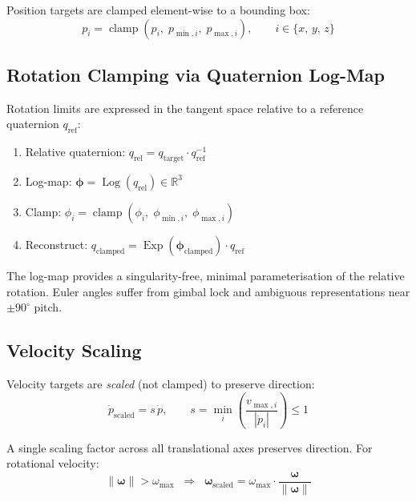 \documentclass[11pt,a4paper]{article}
\newcommand{\R}{\mathbb{R}}
\newcommand{\Exp}{\operatorname{Exp}}
\newcommand{\Log}{\operatorname{Log}}
\newcommand{\clamp}{\operatorname{clamp}}
\begin{document}
Position targets are clamped element-wise to a bounding box:
\[
  p_i = \clamp(p_i,\; p_{\min,i},\; p_{\max,i}),
  \qquad i \in \{x,\,y,\,z\}
\]

\subsection{Rotation Clamping via Quaternion Log-Map}
\label{sec:rot_clamp}

Rotation limits are expressed in the tangent space relative to a reference
quaternion $q_{\text{ref}}$:

\begin{enumerate}[nosep]
  \item Relative quaternion:
    $q_{\text{rel}} = q_{\text{target}} \cdot q_{\text{ref}}^{-1}$
  \item Log-map:
    $\bm{\phi} = \Log(q_{\text{rel}}) \in \R^3$
  \item Clamp:
    $\phi_i = \clamp(\phi_i,\;\phi_{\min,i},\;\phi_{\max,i})$
  \item Reconstruct:
    $q_{\text{clamped}} = \Exp(\bm{\phi}_{\text{clamped}}) \cdot q_{\text{ref}}$
\end{enumerate}

\begin{reasonbox}
The log-map provides a singularity-free, minimal parameterisation of the
relative rotation.  Euler angles suffer from gimbal lock and ambiguous
representations near $\pm 90^\circ$ pitch.
\end{reasonbox}

\subsection{Velocity Scaling}

Velocity targets are \emph{scaled} (not clamped) to preserve direction:
\[
  \dot{p}_{\text{scaled}} = s\,\dot{p},
  \qquad
  s = \min_i\!\left(\frac{v_{\max,i}}{|\dot{p}_i|}\right) \le 1
\]

A single scaling factor across all translational axes preserves direction.
For rotational velocity:
\[
  \|\bm{\omega}\| > \omega_{\max}
  \;\;\Longrightarrow\;\;
  \bm{\omega}_{\text{scaled}} = \omega_{\max} \cdot \frac{\bm{\omega}}{\|\bm{\omega}\|}
\]

\end{document}
